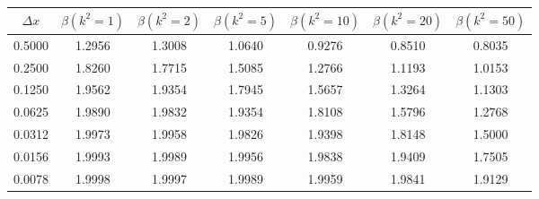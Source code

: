 \begin{tabular}{|c|c|c|c|c|c|c|}
\hline
\textbf{$\Delta x$}&\textbf{$\beta(k^2=1)$}&\textbf{$\beta(k^2=2)$}&\textbf{$\beta(k^2=5)$}&\textbf{$\beta(k^2=10)$}&\textbf{$\beta(k^2=20)$}&\textbf{$\beta(k^2=50)$}\\\hline
0.5000&1.2956&1.3008&1.0640&0.9276&0.8510&0.8035\\\hline
0.2500&1.8260&1.7715&1.5085&1.2766&1.1193&1.0153\\\hline
0.1250&1.9562&1.9354&1.7945&1.5657&1.3264&1.1303\\\hline
0.0625&1.9890&1.9832&1.9354&1.8108&1.5796&1.2768\\\hline
0.0312&1.9973&1.9958&1.9826&1.9398&1.8148&1.5000\\\hline
0.0156&1.9993&1.9989&1.9956&1.9838&1.9409&1.7505\\\hline
0.0078&1.9998&1.9997&1.9989&1.9959&1.9841&1.9129\\\hline
\end{tabular}
